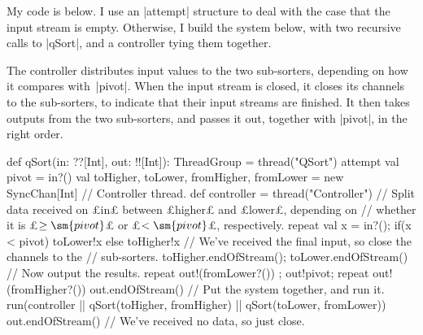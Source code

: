 \begin{answerS}
My code is below.  I use an |attempt| structure to deal with the case that the
input stream is empty.  Otherwise, I build the system below, with two
recursive calls to |qSort|, and a controller tying them together.
%
\begin{center}
\end{center}
%
The controller distributes input values to the two sub-sorters, depending on
how it compares with~|pivot|.  When the input stream is closed, it closes its
channels to the sub-sorters, to indicate that their input streams are
finished.  It then takes outputs from the two sub-sorters, and passes it out,
together with |pivot|, in the right order.
%
\begin{scala}
  def qSort(in: ??[Int], out: !![Int]): ThreadGroup = thread("QSort"){
    attempt{
      val pivot = in?()
      val toHigher, toLower, fromHigher, fromLower = new SyncChan[Int]
      // Controller thread.
      def controller = thread("Controller"){
	// Split data received on £in£ between £higher£ and £lower£, depending on
	// whether it is £$\ge \sm{pivot}$£ or £$< \sm{pivot}$£, respectively.
	repeat{ val x = in?(); if(x < pivot) toLower!x else toHigher!x }
	// We've received the final input, so close the channels to the
	// sub-sorters.
	toHigher.endOfStream(); toLower.endOfStream()
	// Now output the results.
	repeat{ out!(fromLower?()) }; out!pivot; repeat{ out!(fromHigher?()) }
	out.endOfStream()
      }      
      // Put the system together, and run it.
      run(controller || qSort(toHigher, fromHigher) || qSort(toLower, fromLower))
    }{ out.endOfStream() } // We've received no data, so just close.
  }
\end{scala}
\end{answerS}
